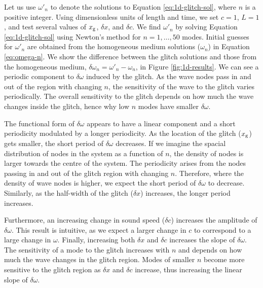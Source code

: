 Let us use \(\omega'_n\) to denote the solutions to Equation \ref{eq:1d-glitch-sol}, where \(n\) is a positive integer. Using dimensionless units of length and time, we set \(c=1\), \(L=1\), and test several values of \(x_{{\mathrm{g}}}\), \(\delta x\), and \(\delta c\). We find \(\omega'_n\) by solving Equation \ref{eq:1d-glitch-sol} using Newton's method for \(n = 1,\dots,50\) modes. Initial guesses for \(\omega'_n\) are obtained from the homogeneous medium solutions (\(\omega_n\)) in Equation \ref{eq:omega-n}. We show the difference between the glitch solutions and those from the homogeneous medium, \(\delta \omega_n = \omega'_n - \omega_n\), in Figure \ref{fig:1d-results}. We can see a periodic component to \(\delta\omega\) induced by the glitch. As the wave nodes pass in and out of the region with changing \(n\), the sensitivity of the wave to the glitch varies periodically. The overall sensitivity to the glitch depends on how much the wave changes inside the glitch, hence why low \(n\) modes have smaller \(\delta\omega\).


The functional form of \(\delta\omega\) appears to have a linear component and a short periodicity modulated by a longer periodicity. As the location of the glitch (\(x_{{\mathrm{g}}}\)) gets smaller, the short period of \(\delta\omega\) decreases. If we imagine the spacial distribution of nodes in the system as a function of \(n\), the density of nodes is larger towards the centre of the system. The periodicity arises from the nodes passing in and out of the glitch region with changing \(n\). Therefore, where the density of wave nodes is higher, we expect the short period of \(\delta\omega\) to decrease. Similarly, as the half-width of the glitch (\(\delta x\)) increases, the longer period increases. 

Furthermore, an increasing change in sound speed (\(\delta c\)) increases the amplitude of \(\delta\omega\). This result is intuitive, as we expect a larger change in \(c\) to correspond to a large change in \(\omega\). Finally, increasing both \(\delta x\) and \(\delta c\) increases the slope of \(\delta\omega\). The sensitivity of a mode to the glitch increases with \(n\) and depends on how much the wave changes in the glitch region. Modes of smaller \(n\) become more sensitive to the glitch region as \(\delta x\) and \(\delta c\) increase, thus increasing the linear slope of \(\delta\omega\).

